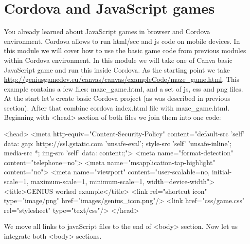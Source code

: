 \chapter{Cordova and JavaScript games}\label{CordovaAndJavascriptGame}

You already learned about JavaScript games in browser and Cordova environment. Cordova allows to run html/scc and js code on mobile devices. In this module we will cover how to use the basic game code from previous modules within Cordova environment. In this module we will take one of Canva %
basic JavaScript game and run this inside Cordova. As the starting point we take \url{http://geniusgamedev.eu/canvas/canvas/exampleCode/maze_game.html}. This example contains a few files: maze\_game.html, and a set of js, css and png files. At the start let's create basic Cordova project (as was described in previous section). After that combine cordova index.html file with maze\_game.html. Beginning with <head> section of both files we join them into one code:

\begin{html}
<head>
        <meta http-equiv="Content-Security-Policy" content="default-src 'self' data: gap: https://ssl.gstatic.com 'unsafe-eval'; style-src 'self' 'unsafe-inline'; media-src *; img-src 'self' data: content:;">
        <meta name="format-detection" content="telephone=no">
        <meta name="msapplication-tap-highlight" content="no">
        <meta name="viewport" content="user-scalable=no, initial-scale=1, maximum-scale=1, minimum-scale=1, width=device-width">
        <title>GENIUS worked example</title>
        <link rel="shortcut icon" type="image/png" href="images/genius_icon.png"/>
        <link href="css/game.css" rel="stylesheet" type="text/css"/>
    </head>
\end{html}

We move all links to javaScript files to the end of <body> section. Now let us integrate both <body> sections.

